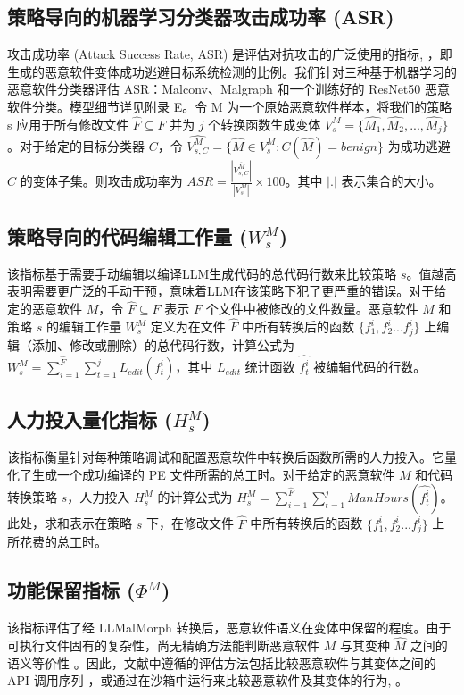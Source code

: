 \subsection{策略导向的机器学习分类器攻击成功率 (ASR)}
攻击成功率 (Attack Success Rate, ASR) 是评估对抗攻击的广泛使用的指标\parencite{Lucas2021}, \parencite{Ling2019}，即生成的恶意软件变体成功逃避目标系统检测的比例。我们针对三种基于机器学习的恶意软件分类器评估 ASR：Malconv\parencite{Raff2017}、Malgraph\parencite{Ling2022} 和一个训练好的 ResNet50 恶意软件分类\parencite{Li2025}。模型细节详见附录 E。令 M 为一个原始恶意软件样本，将我们的策略 s 应用于所有修改文件 $\hat{F} \subseteq F$ 并为 $j$ 个转换函数生成变体 $V_{s}^{M} = \{\hat{M_{1}}, \hat{M_{2}}, ..., \hat{M_{j}}\}$。对于给定的目标分类器 $C$，令 $\hat{V_{s,C}^{M}} = \{ \hat{M} \in V_{s}^{M} : C(\hat{M}) = benign\}$ 为成功逃避 $C$ 的变体子集。则攻击成功率为 $ASR = \frac{|\hat{V_{s,C}^{M}}|}{|V_{s}^{M}|} \times 100$。其中 $|.|$ 表示集合的大小。

\subsection{策略导向的代码编辑工作量 ($W_{s}^{M}$)}
该指标基于需要手动编辑以编译LLM生成代码的总代码行数来比较策略 $s$。值越高表明需要更广泛的手动干预，意味着LLM在该策略下犯了更严重的错误。对于给定的恶意软件 $M$，令 $\hat{F} \subseteq F$ 表示 $F$ 个文件中被修改的文件数量。恶意软件 $M$ 和策略 $s$ 的编辑工作量 $W_s^{M}$ 定义为在文件 $\hat{F}$ 中所有转换后的函数 $\{f_{1}^{i}, f_{2}^{i}... f_{j}^{i}\}$ 上编辑（添加、修改或删除）的总代码行数，计算公式为 $W_{s}^{M}=\sum_{i=1}^{\hat{F}} \sum_{t=1}^{j} L_{edit}(f_{t}^{i})$，其中 $L_{edit}$ 统计函数 $\hat{f_{t}^{i}}$ 被编辑代码的行数。

\subsection{人力投入量化指标 ($H_{s}^{M}$)}
该指标衡量针对每种策略调试和配置恶意软件中转换后函数所需的人力投入。它量化了生成一个成功编译的 PE 文件所需的总工时。对于给定的恶意软件 $M$ 和代码转换策略 $s$，人力投入 $H_{s}^{M}$ 的计算公式为 $H_{s}^{M} = \sum_{i=1}^{\hat{F}} \sum_{t=1}^{j} ManHours(\hat{f_{t}^{i}})$。此处，求和表示在策略 $s$ 下，在修改文件 $\hat{F}$ 中所有转换后的函数 $\{f_{1}^{i},f_{2}^{i}...f_{j}^{i}\}$ 上所花费的总工时。

\subsection{功能保留指标 ($\Phi^{M}$)}
该指标评估了经 LLMalMorph 转换后，恶意软件语义在变体中保留的程度。由于可执行文件固有的复杂性，尚无精确方法能判断恶意软件 $M$ 与其变种 $\hat{M}$ 之间的语义等价性 \parencite{Apel2009}。因此，文献中遵循的评估方法包括比较恶意软件与其变体之间的 API 调用序列 \parencite{Ling2024}，或通过在沙箱中运行来比较恶意软件及其变体的行为\parencite{Lucas2021}, \parencite{Digregorio2024}。

